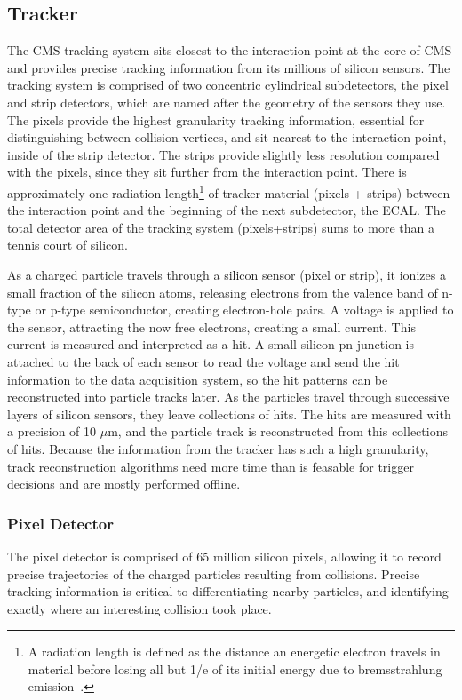 \subsection{Tracker}
The CMS tracking system sits closest to the interaction point at the core of CMS and provides precise tracking information from its millions of silicon sensors.
The tracking system is comprised of two concentric cylindrical subdetectors, the pixel and strip detectors, which are named after the geometry of the sensors they use. 
The pixels provide the highest granularity tracking information, essential for distinguishing between collision vertices, and sit nearest to the interaction point,
inside of the strip detector.
The strips provide slightly less resolution compared with the pixels, since they sit further from the interaction point. There is approximately one
radiation length\footnote{A radiation length is defined as the distance an energetic electron travels in material before losing all but 1/e of its
initial energy due to bremsstrahlung emission~\cite{radiation_length}.}
of tracker material (pixels + strips) between the interaction point and the beginning of the next subdetector, the ECAL.
The total detector area of the tracking system (pixels+strips) sums to more than a tennis court of silicon.

As a charged particle travels through a silicon sensor (pixel or strip), it ionizes a small fraction of the silicon atoms, releasing electrons from the valence band of n-type or p-type
semiconductor,
creating electron-hole pairs. A voltage is applied to the sensor, attracting the now free electrons, creating a small current. This current is measured and interpreted as a hit.
A small silicon pn junction is attached to the back of each sensor to read the voltage and send the hit information to the data acquisition system,
so the hit patterns can be reconstructed into particle tracks later.   
As the particles travel through successive layers of silicon sensors, they leave collections of hits.
The hits are measured with a precision of 10 $\mu$m, and the particle track is reconstructed from this collections of hits. 
Because the information from the tracker has such a high granularity, track reconstruction algorithms need more time than is feasable for trigger decisions
and are mostly performed offline.


\subsubsection{Pixel Detector}
The pixel detector is comprised of 65 million silicon pixels, allowing it to record
precise trajectories of the charged particles resulting from collisions. Precise tracking information is critical to differentiating nearby particles, and identifying
exactly where an interesting collision took place. 

